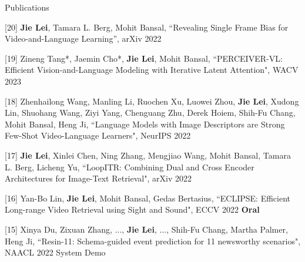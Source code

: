 \documentclass{resume} %
\begin{document}

\begin{rSection}{Publications}          
    \item {[20] 
    \textbf{Jie Lei}, Tamara L. Berg, Mohit Bansal,
    ``Revealing Single Frame Bias for Video-and-Language Learning'',
     arXiv 2022
    }      
    \item {[19] 
    Zineng Tang*, Jaemin Cho*, \textbf{Jie Lei}, Mohit Bansal, 
    ``PERCEIVER-VL: Efficient Vision-and-Language Modeling with Iterative Latent Attention", 
    WACV 2023
    }        
    \item {[18] 
    Zhenhailong Wang, Manling Li, Ruochen Xu, Luowei Zhou,  \textbf{Jie Lei}, Xudong Lin, Shuohang Wang, Ziyi Yang, Chenguang Zhu, Derek Hoiem, Shih-Fu Chang, Mohit Bansal, Heng Ji,
    ``Language Models with Image Descriptors are Strong Few-Shot Video-Language Learners",
     NeurIPS 2022
    }      
    \item {[17] 
    \textbf{Jie Lei}, Xinlei Chen, Ning Zhang, Mengjiao Wang, Mohit Bansal, Tamara L. Berg, Licheng Yu,
    ``LoopITR: Combining Dual and Cross Encoder Architectures for Image-Text Retrieval", 
    arXiv 2022
    }             
    \item {[16] 
    Yan-Bo Lin, \textbf{Jie Lei}, Mohit Bansal, Gedas Bertasius,
    ``ECLIPSE: Efficient Long-range Video Retrieval using Sight and Sound",
     ECCV 2022 {\color{bittersweet}\textbf{Oral}} 
    }              

    \item {[15] 
    Xinya Du, Zixuan Zhang, ..., \textbf{Jie Lei}, ..., Shih-Fu Chang, Martha Palmer, Heng Ji,
    ``Resin-11: Schema-guided event prediction for 11 newsworthy scenarios",
     NAACL 2022 System Demo
    }       
    

\end{rSection}
\end{document}
